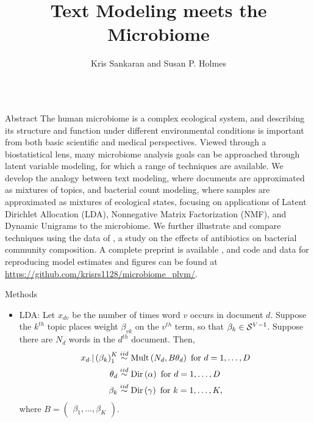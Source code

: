\documentclass[final]{beamer}
\title{Text Modeling meets the Microbiome}
\author{Kris Sankaran and Susan P. Holmes}
\institute{Department of Statistics, Stanford University}
\newlength{\onecolwid}
\begin{document}
\begin{frame}

\begin{columns}
\begin{column}{\onecolwid}

\begin{block}{Abstract}
The human microbiome is a complex ecological system, and describing its
structure and function under different environmental conditions is important
from both basic scientific and medical perspectives. Viewed through a
biostatistical lens, many microbiome analysis goals can be approached through
latent variable modeling, for which a range of techniques are available. We
develop the analogy between text modeling, where documents are approximated as
mixtures of topics, and bacterial count modeling, where samples are approximated
as mixtures of ecological states, focusing on applications of Latent Dirichlet
Allocation (LDA), Nonnegative Matrix Factorization (NMF), and Dynamic Unigrams
to the microbiome. We further illustrate and compare techniques using the data
of \citep{dethlefsen2011incomplete}, a study on the effects of antibiotics on
bacterial community composition. A complete preprint is available
\citep{sankaran2017latent}, and code and data for reproducing model estimates
and figures can be found at
\url{https://github.com/krisrs1128/microbiome_plvm/}.
\end{block}

\begin{block}{Methods}
  \begin{itemize}
\item LDA: Let $x_{dv}$ be the number of times word $v$
  occurs in document $d$. Suppose the $k^{th}$ topic places weight $\beta_{vk}$
  on the $v^{th}$ term, so that $\beta_{k} \in \mathcal{S}^{V - 1}$. Suppose there
  are $N_{d}$ words in the $d^{th}$ document. Then,
\begin{align*}
x_{d\cdot} \vert \left(\beta_{k}\right)_{1}^{K} &\overset{iid}{\sim} \textnormal{Mult}\left(N_{d}, B\theta_{d}\right) \text{ for } d = 1, \dots, D\\
\theta_{d} &\overset{iid}{\sim} \textnormal{Dir}\left(\alpha\right) \text{ for } d = 1, \dots, D \\
\beta_{k} &\overset{iid}{\sim} \textnormal{Dir}\left(\gamma\right) \text{ for }k = 1, \dots, K,
\end{align*}
where $B = \begin{pmatrix}\beta_{1}, \dots, \beta_{K}\end{pmatrix}$.


\end{itemize}
\end{block}
\end{column}
\end{columns}
\end{frame}
\end{document}
